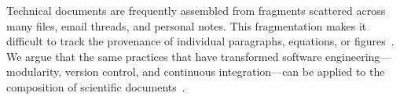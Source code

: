 Technical documents are frequently assembled from fragments scattered
across many files, email threads, and personal notes. This fragmentation
makes it difficult to track the provenance of individual paragraphs,
equations, or figures~\cite{smith2023}. We argue that the same practices
that have transformed software engineering---modularity, version control,
and continuous integration---can be applied to the composition of
scientific documents~\cite{feloni2024}.
